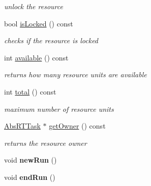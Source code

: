 \begin{DoxyCompactItemize}
\begin{DoxyCompactList}\small\item\em unlock the resource \end{DoxyCompactList}\item 
bool \hyperlink{classRTSim_1_1Resource_afb4669d32c5db77ec37e7edff8b0ad45}{is\+Locked} () const \hypertarget{classRTSim_1_1Resource_afb4669d32c5db77ec37e7edff8b0ad45}{}\label{classRTSim_1_1Resource_afb4669d32c5db77ec37e7edff8b0ad45}

\begin{DoxyCompactList}\small\item\em checks if the resource is locked \end{DoxyCompactList}\item 
int \hyperlink{classRTSim_1_1Resource_a6f3c631e0cacd8617c4fafcd9de1fac0}{available} () const \hypertarget{classRTSim_1_1Resource_a6f3c631e0cacd8617c4fafcd9de1fac0}{}\label{classRTSim_1_1Resource_a6f3c631e0cacd8617c4fafcd9de1fac0}

\begin{DoxyCompactList}\small\item\em returns how many resource units are available \end{DoxyCompactList}\item 
int \hyperlink{classRTSim_1_1Resource_a0e035922e5b90b5467c8115ed4fd0908}{total} () const \hypertarget{classRTSim_1_1Resource_a0e035922e5b90b5467c8115ed4fd0908}{}\label{classRTSim_1_1Resource_a0e035922e5b90b5467c8115ed4fd0908}

\begin{DoxyCompactList}\small\item\em maximum number of resource units \end{DoxyCompactList}\item 
\hyperlink{classRTSim_1_1AbsRTTask}{Abs\+R\+T\+Task} $\ast$ \hyperlink{classRTSim_1_1Resource_a32a8927b522f27adbb37452502ecdad9}{get\+Owner} () const \hypertarget{classRTSim_1_1Resource_a32a8927b522f27adbb37452502ecdad9}{}\label{classRTSim_1_1Resource_a32a8927b522f27adbb37452502ecdad9}

\begin{DoxyCompactList}\small\item\em returns the resource owner \end{DoxyCompactList}\item 
void {\bfseries new\+Run} ()\hypertarget{classRTSim_1_1Resource_a85ae90d04c090a0702839b7f10e9bfb7}{}\label{classRTSim_1_1Resource_a85ae90d04c090a0702839b7f10e9bfb7}

\item 
void {\bfseries end\+Run} ()\hypertarget{classRTSim_1_1Resource_aa50100e6ec17a39476d25d1510b03c21}{}\label{classRTSim_1_1Resource_aa50100e6ec17a39476d25d1510b03c21}

\end{DoxyCompactItemize}
